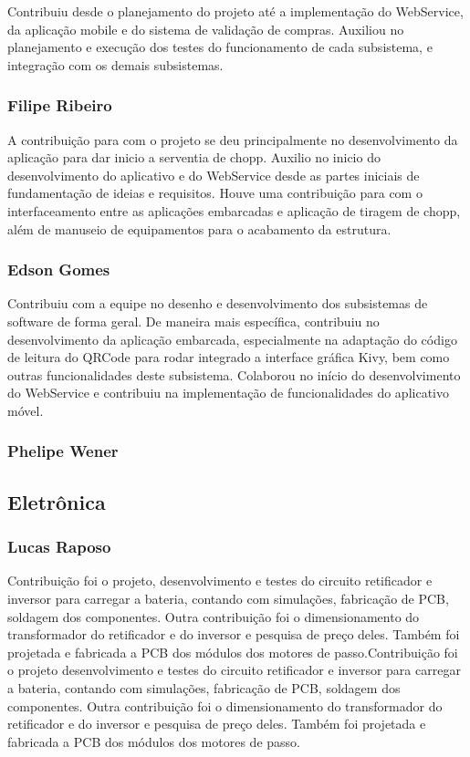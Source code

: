 \begin{apendicesenv}
Contribuiu desde o planejamento do projeto até a implementação do WebService, da aplicação mobile
e do sistema de validação de compras. Auxiliou no planejamento e execução dos testes do funcionamento
de cada subsistema, e integração com os demais subsistemas.

\subsubsection{Filipe Ribeiro}

A contribuição para com o projeto se deu principalmente no desenvolvimento da aplicação para dar inicio
a serventia de chopp. Auxilio no inicio do desenvolvimento do aplicativo e do WebService desde as partes
iniciais de fundamentação de ideias e requisitos. Houve uma contribuição para com o interfaceamento entre 
as aplicações embarcadas e aplicação de tiragem de chopp, além de manuseio de equipamentos para o acabamento
da estrutura.

\subsubsection{Edson Gomes}

Contribuiu com a equipe no desenho e desenvolvimento dos subsistemas de software de forma geral.
De maneira mais específica, contribuiu no desenvolvimento da aplicação embarcada, especialmente na adaptação 
do código de leitura do QRCode para rodar integrado a interface gráfica Kivy, bem como outras funcionalidades
deste subsistema. Colaborou no início do desenvolvimento do WebService e contribuiu na implementação de
funcionalidades do aplicativo móvel.

\subsubsection{Phelipe Wener}

\subsection{Eletrônica}

\subsubsection{Lucas Raposo}

Contribuição foi o projeto, desenvolvimento e testes do circuito retificador
e inversor para carregar a bateria, contando com simulações, fabricação de PCB,
soldagem dos componentes. Outra contribuição foi o dimensionamento do transformador 
do retificador e do inversor e pesquisa de preço deles. Também foi projetada e fabricada
a PCB dos módulos dos motores de passo.Contribuição foi o projeto desenvolvimento
e testes do circuito retificador e inversor para carregar a bateria, contando com simulações, 
fabricação de PCB, soldagem dos componentes. Outra contribuição foi o dimensionamento
do transformador do retificador e do inversor e pesquisa de preço deles. Também foi projetada
e fabricada a PCB dos módulos dos motores de passo.


\end{apendicesenv}
